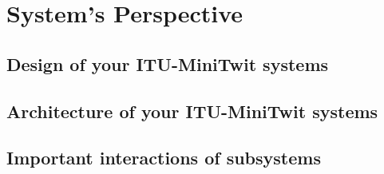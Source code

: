 \section{System's Perspective}
\subsection{Design of your ITU-MiniTwit systems}
\subsection{Architecture of your ITU-MiniTwit systems}
\subsection{Important interactions of subsystems}